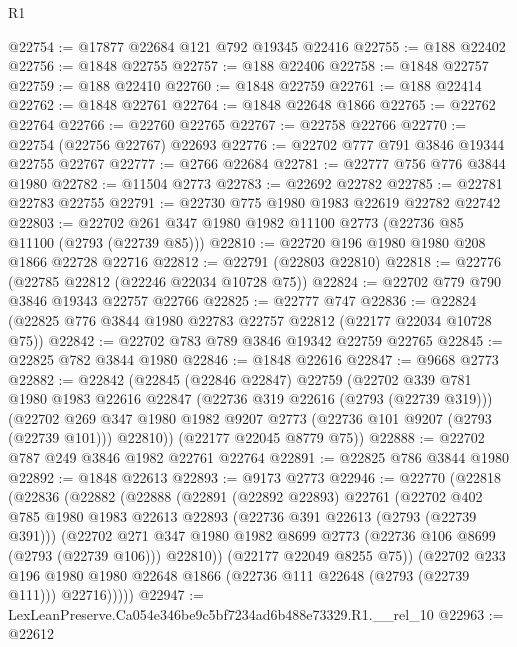 \begin{lexlean}{R1}
\begin{coremodule}
@22754 := @17877 @22684 @121 @792 @19345 @22416
@22755 := @188 @22402
@22756 := @1848 @22755
@22757 := @188 @22406
@22758 := @1848 @22757
@22759 := @188 @22410
@22760 := @1848 @22759
@22761 := @188 @22414
@22762 := @1848 @22761
@22764 := @1848 @22648 @1866
@22765 := @22762 @22764
@22766 := @22760 @22765
@22767 := @22758 @22766
@22770 := @22754 (@22756 @22767) @22693
@22776 := @22702 @777 @791 @3846 @19344 @22755 @22767
@22777 := @2766 @22684
@22781 := @22777 @756 @776 @3844 @1980
@22782 := @11504 @2773
@22783 := @22692 @22782
@22785 := @22781 @22783 @22755
@22791 := @22730 @775 @1980 @1983 @22619 @22782 @22742
@22803 := @22702 @261 @347 @1980 @1982 @11100 @2773 (@22736 @85 @11100 (@2793 (@22739 @85)))
@22810 := @22720 @196 @1980 @1980 @208 @1866 @22728 @22716
@22812 := @22791 (@22803 @22810)
@22818 := @22776 (@22785 @22812 (@22246 @22034 @10728 @75))
@22824 := @22702 @779 @790 @3846 @19343 @22757 @22766
@22825 := @22777 @747
@22836 := @22824 (@22825 @776 @3844 @1980 @22783 @22757 @22812 (@22177 @22034 @10728 @75))
@22842 := @22702 @783 @789 @3846 @19342 @22759 @22765
@22845 := @22825 @782 @3844 @1980
@22846 := @1848 @22616
@22847 := @9668 @2773
@22882 := @22842
    (@22845
      (@22846 @22847)
      @22759
      (@22702
        @339
        @781
        @1980
        @1983
        @22616
        @22847
        (@22736 @319 @22616 (@2793 (@22739 @319)))
        (@22702 @269 @347 @1980 @1982 @9207 @2773 (@22736 @101 @9207 (@2793 (@22739 @101))) @22810))
      (@22177 @22045 @8779 @75))
@22888 := @22702 @787 @249 @3846 @1982 @22761 @22764
@22891 := @22825 @786 @3844 @1980
@22892 := @1848 @22613
@22893 := @9173 @2773
@22946 := @22770
    (@22818
      (@22836
        (@22882
          (@22888
            (@22891
              (@22892 @22893)
              @22761
              (@22702
                @402
                @785
                @1980
                @1983
                @22613
                @22893
                (@22736 @391 @22613 (@2793 (@22739 @391)))
                (@22702
                  @271
                  @347
                  @1980
                  @1982
                  @8699
                  @2773
                  (@22736 @106 @8699 (@2793 (@22739 @106)))
                  @22810))
              (@22177 @22049 @8255 @75))
            (@22702
              @233
              @196
              @1980
              @1980
              @22648
              @1866
              (@22736 @111 @22648 (@2793 (@22739 @111)))
              @22716)))))
@22947 := LexLeanPreserve.Ca054e346be9c5bf7234ad6b488e73329.R1.__rel_10
@22963 := @22612

\end{coremodule}
\end{lexlean}
